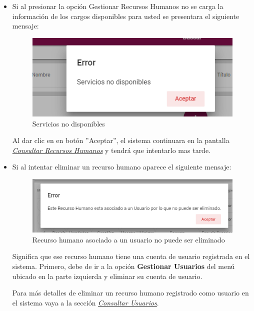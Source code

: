           \begin{itemize}   
                \item Si al  presionar la opción Gestionar Recursos Humanos no se carga la información de los cargos disponibles para usted se presentara el siguiente mensaje:
            
             \begin{figure}[!hbtp]
                \centering
                \includegraphics[width=0.4\linewidth]{images/SP1/MSGSN}
                \caption{Servicios no disponibles}
                \label{SND}
                
            \end{figure}
            
                    Al dar clic en en botón ''Aceptar'', el sistema continuara en la pantalla  \hyperlink{consultarRH}{\textit{Consultar Recursos Humanos}} y tendrá que intentarlo  mas tarde.
            
              
              \item Si al intentar eliminar un recurso humano aparece el siguiente mensaje:
                \begin{figure}[!hbtp]
                   \centering
                   \includegraphics[width=0.4\linewidth]{images/SP1/MSG56}
                    \caption{Recurso humano asociado a un usuario no puede ser eliminado}
                   \label{mensaje56}
                \end{figure}

                Significa que ese recurso humano tiene una cuenta de usuario registrada en el sistema. Primero, debe de ir a la opción \textbf{Gestionar Usuarios} del menú ubicado en la parte izquierda y eliminar su cuenta de usuario.

                Para más detalles de eliminar un recurso humano registrado como usuario en el sistema vaya a la sección \hyperlink{consultarUs}{\textit{Consultar Usuarios}}.

           
           \end{itemize} 

